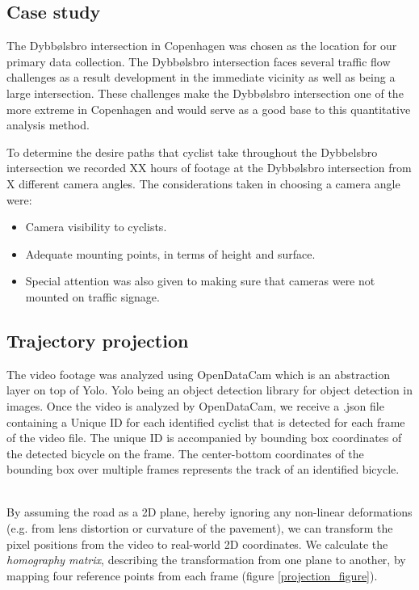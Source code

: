 \documentclass[
10pt, %
a4paper, %
oneside, %
headinclude,footinclude, %
] {book}%
\begin{document}
\subsection{Case study}
The Dybbølsbro intersection in Copenhagen was chosen as the location for our primary data collection. 
The Dybbølsbro intersection faces several traffic flow challenges as a result development in the immediate vicinity as well as being a large intersection.
These challenges make the Dybbølsbro intersection one of the more extreme in Copenhagen and would serve as a good base to this quantitative analysis method. 

To determine the desire paths that cyclist take throughout the Dybbelsbro intersection we recorded XX hours of footage 
at the Dybbølsbro intersection from X different camera angles.
The considerations taken in choosing a camera angle were:

\begin{itemize}
	\item Camera visibility to cyclists.
	\item Adequate mounting points, in terms of height and surface.
	\item Special attention was also given to making sure that cameras were not mounted on traffic signage.
\end{itemize}

\subsection{Trajectory projection}
The video footage was analyzed using OpenDataCam which is an abstraction layer on top of Yolo. Yolo being an object detection library for object detection in images.
Once the video is analyzed by OpenDataCam, we receive a .json file containing a Unique ID for each identified cyclist that is detected for each frame of the video file. 
The unique ID is accompanied by bounding box coordinates of the detected bicycle on the frame. 
The center-bottom coordinates of the bounding box over multiple frames represents the track of an identified bicycle.

\ \\
By assuming the road as a 2D plane, hereby ignoring any non-linear deformations (e.g. from lens distortion or curvature of the pavement), 
we can transform the pixel positions from the video to real-world 2D coordinates. 
We calculate the \textit{homography matrix}, describing the transformation from one plane to another, by mapping four reference points from each frame (figure \ref{projection_figure}).
\end{document}
